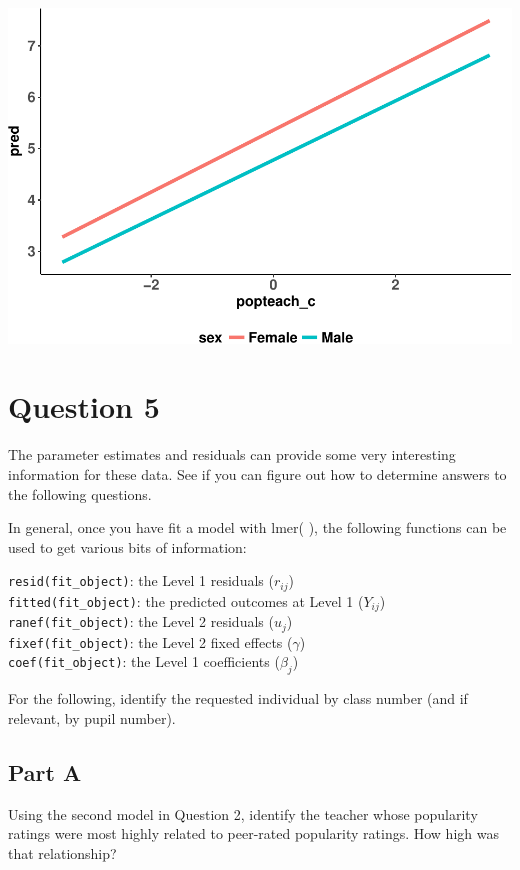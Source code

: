 \documentclass[]{article}
\begin{document}
\includegraphics{Beck_HW_3_files/figure-latex/unnamed-chunk-2-1.pdf}

\section{Question 5}\label{question-5}

The parameter estimates and residuals can provide some very interesting
information for these data. See if you can figure out how to determine
answers to the following questions.

In general, once you have fit a model with lmer( ), the following
functions can be used to get various bits of information:

\texttt{resid(fit\_object)}: the Level 1 residuals (\(r_{ij}\))\\
\texttt{fitted(fit\_object)}: the predicted outcomes at Level 1
(\(Y_{ij}\))\\
\texttt{ranef(fit\_object)}: the Level 2 residuals (\(u_j\))\\
\texttt{fixef(fit\_object)}: the Level 2 fixed effects (\(\gamma\))\\
\texttt{coef(fit\_object)}: the Level 1 coefficients (\(\beta_j\))

For the following, identify the requested individual by class number
(and if relevant, by pupil number).

\subsection{Part A}\label{part-a-4}

Using the second model in Question 2, identify the teacher whose
popularity ratings were most highly related to peer-rated popularity
ratings. How high was that relationship?
\end{document}
